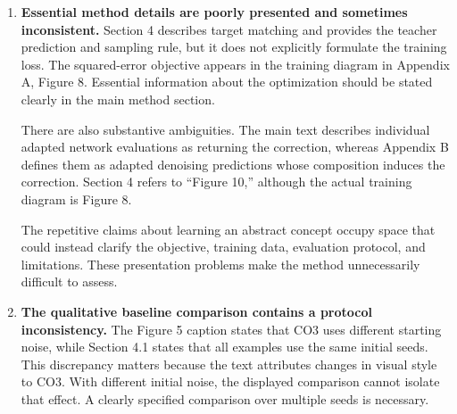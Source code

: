 {\begin{tcolorbox}[breakable,colback=red!3,colframe=red!45!black,title={The review by k4nd, as posted on OpenReview}]
\begin{enumerate}
\par The paper does include detector-based counts, manually verified, in Figure 4. However, these concern an oracle correction derived from the joint prompt for one cat-dog pair and four seeds. They do not establish the effectiveness or generalization of the learned adapter.
\par This omission is particularly serious given the reported substitutions, additional objects, and style-dependent failures. Such examples do not themselves disprove generalization, but their prevalence must be measured. The paper needs aggregate success and failure rates across a sufficiently large, documented test set and multiple seeds, together with uncertainty estimates and image-quality evaluation.
\par The manuscript states that evaluation concepts and starting noise are excluded from adapter training. However, the complete splits and aggregate results needed to assess this claim are missing. A few successful held-out examples cannot substantiate the broad claim that the adapter learns a general, transferable concept of plurality. Likewise, one failed joint-prompt image does not establish that a concept combination is poorly represented in pretraining or generally beyond joint prompting.
\item \textbf{Essential method details are poorly presented and sometimes inconsistent.} Section 4 describes target matching and provides the teacher prediction and sampling rule, but it does not explicitly formulate the training loss. The squared-error objective appears in the training diagram in Appendix A, Figure 8. Essential information about the optimization should be stated clearly in the main method section.
\par There are also substantive ambiguities. The main text describes individual adapted network evaluations as returning the correction, whereas Appendix B defines them as adapted denoising predictions whose composition induces the correction. Section 4 refers to ``Figure 10,'' although the actual training diagram is Figure 8.
\par The repetitive claims about learning an abstract concept occupy space that could instead clarify the objective, training data, evaluation protocol, and limitations. These presentation problems make the method unnecessarily difficult to assess.
\item \textbf{The qualitative baseline comparison contains a protocol inconsistency.} The Figure 5 caption states that CO3 uses different starting noise, while Section 4.1 states that all examples use the same initial seeds. This discrepancy matters because the text attributes changes in visual style to CO3. With different initial noise, the displayed comparison cannot isolate that effect. A clearly specified comparison over multiple seeds is necessary.
\end{enumerate}

\end{tcolorbox}}
